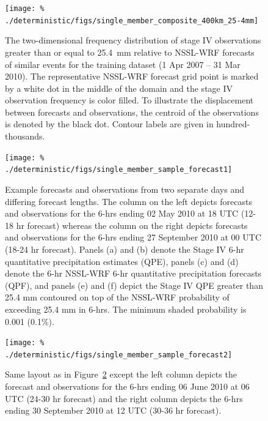\clearpage
\begin{figure}[cc]
    \centering
    \texttt{[image: \%
    ./deterministic/figs/single\_member\_composite\_400km\_25-4mm]}\\
    \caption{The two-dimensional frequency distribution of stage IV observations greater than or equal to \mbox{25.4 mm} relative to NSSL-WRF forecasts of similar events for the training dataset (1 Apr 2007 -- 31 Mar 2010).
    The representative NSSL-WRF forecast grid point is marked by a white dot in the middle of the domain and the stage IV observation frequency is color filled.
    To illustrate the displacement between forecasts and observations, the centroid of the observations is denoted by the black dot.
    Contour labels are given in hundred-thousands.}
    \label{single_25thresh}
\end{figure}


\clearpage
\begin{figure}[cc]
    \centering
    \texttt{[image: \%
    ./deterministic/figs/single\_member\_sample\_forecast1]}\\
    \caption{Example forecasts and observations from two separate days and differing forecast lengths.
    The column on the left depicts forecasts and observations for the 6-hrs ending 02 May 2010 at 18 UTC (12-18 hr forecast) whereas the column on the right depicts forecasts and observations for the 6-hrs ending 27 September 2010 at 00 UTC (18-24 hr forecast).
    Panels (a) and (b) denote the Stage IV 6-hr quantitative precipitation estimates (QPE), panels (c) and (d) denote the 6-hr NSSL-WRF 6-hr quantitative precipitation forecasts (QPF), and panels (e) and (f) depict the Stage IV QPE greater than 25.4 mm contoured on top of the NSSL-WRF probability of exceeding 25.4 mm in 6-hrs. The minimum shaded probability is 0.001 (0.1\%).}
    \label{single_sample1}
\end{figure}


\clearpage
\begin{figure}[cc]
    \centering
    \texttt{[image: \%
    ./deterministic/figs/single\_member\_sample\_forecast2]}\\
    \caption{Same layout as in \mbox{Figure \ref{single_sample1}} except the left column depicts the forecast and observations for the 6-hrs ending 06 June 2010 at 06 UTC (24-30 hr forecast) and the right column depicts the 6-hrs ending 30 September 2010 at 12 UTC (30-36 hr forecast).}
    \label{single_sample2}
\end{figure}


